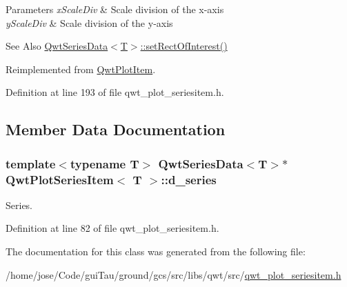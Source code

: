 \begin{DoxyParams}{Parameters}
{\em x\-Scale\-Div} & Scale division of the x-\/axis \\
\hline
{\em y\-Scale\-Div} & Scale division of the y-\/axis\\
\hline
\end{DoxyParams}
\begin{DoxySeeAlso}{See Also}
\hyperlink{class_qwt_series_data_a81466c72589c03310543d17e1f1d0ab7}{Qwt\-Series\-Data$<$\-T$>$\-::set\-Rect\-Of\-Interest()} 
\end{DoxySeeAlso}


Reimplemented from \hyperlink{class_qwt_plot_item_abf6a70847d3db952161ca4d4a952eea0}{Qwt\-Plot\-Item}.



Definition at line 193 of file qwt\-\_\-plot\-\_\-seriesitem.\-h.



\subsection{Member Data Documentation}
\hypertarget{class_qwt_plot_series_item_a5ec27b9647fcd02517f437f0e66c0950}{
\subsubsection[{d\-\_\-series}]{\setlength{\rightskip}{0pt plus 5cm}template$<$typename T$>$ {\bf Qwt\-Series\-Data}$<$T$>$$\ast$ {\bf Qwt\-Plot\-Series\-Item}$<$ T $>$\-::d\-\_\-series\hspace{0.3cm}{\ttfamily [protected]}}}\label{class_qwt_plot_series_item_a5ec27b9647fcd02517f437f0e66c0950}


Series. 



Definition at line 82 of file qwt\-\_\-plot\-\_\-seriesitem.\-h.



The documentation for this class was generated from the following file\-:\begin{DoxyCompactItemize}
\item 
/home/jose/\-Code/gui\-Tau/ground/gcs/src/libs/qwt/src/\hyperlink{qwt__plot__seriesitem_8h}{qwt\-\_\-plot\-\_\-seriesitem.\-h}\end{DoxyCompactItemize}
